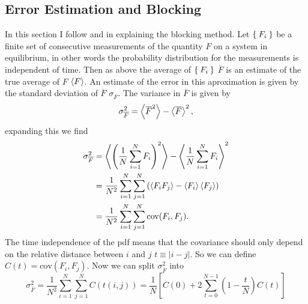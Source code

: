 \documentclass[a4paper,English,10pt]{article}
\newcommand{\be}{\begin{equation}}
\newcommand{\ee}{\end{equation}}
\newcommand{\f}{\frac}
\renewcommand{\bar}{\overline}
\renewcommand{\braket}{\Braket}
\begin{document}
\subsection{Error Estimation and Blocking}
In this section I follow \cite{block} and \cite{mortenbok} in explaining the blocking method.
Let $\Set{F_i}$ be a finite set of consecutive measurements of the quantity $F$ on a system in equilibrium, in other words the probability distribution for the measurements is
independent of time. Then as above the average of $\Set{F_i}$ $\bar{F}$ is an estimate of the true average of $F$ $\braket{F}$. An estimate of the error in this aproximation
is given by the standard deviation of $\bar{F}$ $\sigma_{\bar{F}}$. The variance in $\bar{F}$ is given by
\be
\sigma_{\bar{F}}^2 = \Braket{\bar{F}^2} - \braket{\bar{F}}^2,
\ee
expanding this we find
\begin{align*}
  \sigma_{\bar{F}}^2 &= \braket{\left(\f{1}{N}\sum_{i=1}^NF_i\right)^2} - \braket{\f{1}{N}\sum_{i=1}^NF_i}^2\\
  &=\f{1}{N^2}\sum_{i=1}^N\sum_{j=1}^N\left(\braket{F_iF_j} - \braket{F_i}\braket{F_j}\right)\\
  &= \f{1}{N^2}\sum_{i=1}^N\sum_{j=1}^N\mathrm{cov}(F_i,F_j).
\end{align*}
The time independence of the pdf means that the covariance should only depend on the relative distance between $i$ and $j$
$t \equiv |i-j|$. So we can define $C(t) = \mathrm{cov}(F_i,F_j)$. Now we can split $\sigma_{\bar{F}}^2$ into
\be
\sigma_{\bar{F}}^2 = \f{1}{N^2}\sum_{i=1}^N\sum_{j=1}^NC(t(i,j)) = \f{1}{N}\left[C(0) + 2\sum_{t = 0}^{N-1}\left(1-\f{t}{N}\right)C(t)\right] \label{errvar}
\ee
\end{document}
